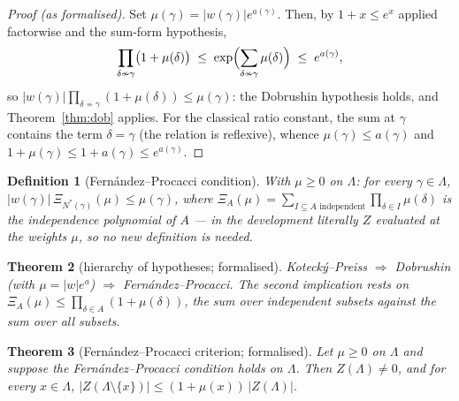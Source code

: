 \documentclass[11pt]{amsart}
\newtheorem{theorem}{Theorem}[section]
\newtheorem{definition}[theorem]{Definition}
\begin{document}
\begin{proof}[Proof (as formalised)]
Set $\mu(\gamma) = \lvert w(\gamma)\rvert e^{a(\gamma)}$. Then, by
$1 + x \le e^{x}$ applied factorwise and the sum-form hypothesis,
\[
  \prod_{\delta \nsim \gamma} \bigl(1 + \mu(\delta)\bigr)
  \;\le\; \exp \Bigl( \sum_{\delta \nsim \gamma} \mu(\delta) \Bigr)
  \;\le\; e^{a(\gamma)},
\]
so $\lvert w(\gamma)\rvert \prod_{\delta \nsim \gamma}(1 + \mu(\delta)) \le
\mu(\gamma)$: the Dobrushin hypothesis holds, and Theorem~\ref{thm:dob}
applies. For the classical ratio constant, the sum at $\gamma$ contains the
term $\delta = \gamma$ (the relation is reflexive), whence
$\mu(\gamma) \le a(\gamma)$ and
$1 + \mu(\gamma) \le 1 + a(\gamma) \le e^{a(\gamma)}$.
\end{proof}

\begin{definition}[Fernández--Procacci condition]
With $\mu \ge 0$ on $\Lambda$: for every $\gamma \in \Lambda$,
$\lvert w(\gamma) \rvert \, \Xi_{N^*(\gamma)}(\mu) \le \mu(\gamma)$, where
$\Xi_A(\mu) = \sum_{I \subseteq A \text{ independent}} \prod_{\delta \in I}
\mu(\delta)$ is the independence polynomial of $A$ — in the development
literally $Z$ evaluated at the weights $\mu$, so no new definition is
needed.
\end{definition}

\begin{theorem}[hierarchy of hypotheses; formalised]\label{thm:hier}
Kotecký--Preiss $\Rightarrow$ Dobrushin (with
$\mu = \lvert w \rvert e^{a}$) $\Rightarrow$ Fernández--Procacci. The
second implication rests on $\Xi_A(\mu) \le \prod_{\delta \in A}(1 +
\mu(\delta))$, the sum over independent subsets against the sum over all
subsets.
\end{theorem}

\begin{theorem}[Fernández--Procacci criterion; formalised]\label{thm:fp}
Let $\mu \ge 0$ on $\Lambda$ and suppose the Fernández--Procacci
condition holds on $\Lambda$. Then $Z(\Lambda) \neq 0$, and for every
$x \in \Lambda$,
$\lvert Z(\Lambda \setminus \{x\})\rvert \le (1 + \mu(x))\,
\lvert Z(\Lambda)\rvert$.
\end{theorem}
\end{document}
